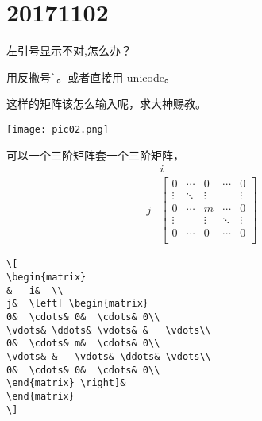 \documentclass[QAofGroup.tex]{subfiles}
\begin{document}
%
%

\chapter{20171102}\label{ch1102}

\begin{qst}\label{Q2017110201}
左引号显示不对,怎么办？
\end{qst}
\ans 用反撇号\verb|`|。或者直接用 unicode。

\begin{qst}\label{Q2017110202}
这样的矩阵该怎么输入呢，求大神赐教。

\texttt{[image: pic02.png]}
\end{qst}
\ans 可以一个三阶矩阵套一个三阶矩阵，
\[
\begin{matrix}
&	i&	\\
j&	\left[ \begin{matrix}
0&	\cdots&	0&	\cdots&	0\\
\vdots&	\ddots&	\vdots&	&	\vdots\\
0&	\cdots&	m&	\cdots&	0\\
\vdots&	&	\vdots&	\ddots&	\vdots\\
0&	\cdots&	0&	\cdots&	0\\
\end{matrix} \right]&
\end{matrix}
\]
\begin{verbatim}
\[
\begin{matrix}
&	i&	\\
j&	\left[ \begin{matrix}
0&	\cdots&	0&	\cdots&	0\\
\vdots&	\ddots&	\vdots&	&	\vdots\\
0&	\cdots&	m&	\cdots&	0\\
\vdots&	&	\vdots&	\ddots&	\vdots\\
0&	\cdots&	0&	\cdots&	0\\
\end{matrix} \right]&
\end{matrix}
\]
\end{verbatim}
\end{document}
